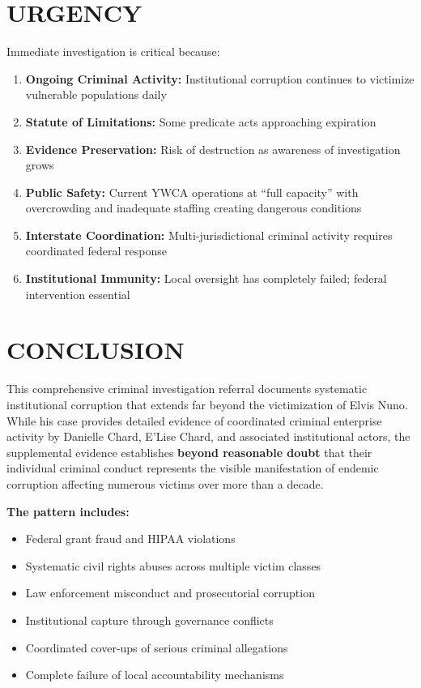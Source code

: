 \documentclass[12pt,oneside]{article}
\begin{document}
\section*{URGENCY}

Immediate investigation is critical because:

\begin{enumerate}
\item \textbf{Ongoing Criminal Activity:} Institutional corruption continues to victimize vulnerable populations daily
\item \textbf{Statute of Limitations:} Some predicate acts approaching expiration
\item \textbf{Evidence Preservation:} Risk of destruction as awareness of investigation grows
\item \textbf{Public Safety:} Current YWCA operations at ``full capacity'' with overcrowding and inadequate staffing creating dangerous conditions
\item \textbf{Interstate Coordination:} Multi-jurisdictional criminal activity requires coordinated federal response
\item \textbf{Institutional Immunity:} Local oversight has completely failed; federal intervention essential
\end{enumerate}

\section*{CONCLUSION}

This comprehensive criminal investigation referral documents systematic institutional corruption that extends far beyond the victimization of Elvis Nuno. While his case provides detailed evidence of coordinated criminal enterprise activity by Danielle Chard, E'Lise Chard, and associated institutional actors, the supplemental evidence establishes \textbf{beyond reasonable doubt} that their individual criminal conduct represents the visible manifestation of endemic corruption affecting numerous victims over more than a decade.

\textbf{The pattern includes:}
\begin{itemize}
\item Federal grant fraud and HIPAA violations
\item Systematic civil rights abuses across multiple victim classes
\item Law enforcement misconduct and prosecutorial corruption
\item Institutional capture through governance conflicts
\item Coordinated cover-ups of serious criminal allegations
\item Complete failure of local accountability mechanisms
\end{itemize}
\end{document}
